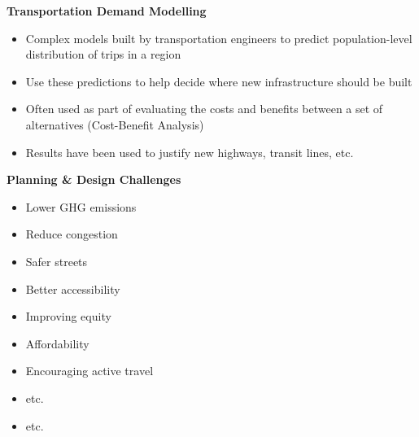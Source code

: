 \documentclass[aspectratio=169]{beamer}
\begin{document}
\begin{frame}
	
	\textbf{Transportation Demand Modelling}
	\vspace{4mm}
	
	\begin{itemize}
		
		\item Complex models built by transportation engineers to predict population-level distribution of trips in a region
		
		\item Use these predictions to help decide where new infrastructure should be built
		
		\item Often used as part of evaluating the costs and benefits between a set of alternatives (Cost-Benefit Analysis)
		
		\item Results have been used to justify new highways, transit lines, etc.
		
	\end{itemize}	
	
\end{frame}


\begin{frame}
	\textbf{Planning \& Design Challenges}
	\vspace{4mm}
	
	\begin{itemize}
		\item Lower GHG emissions
		\item Reduce congestion
		\item Safer streets
		\item Better accessibility
		\item Improving equity
		\item Affordability
		\item Encouraging active travel	
		\item etc.
		\item etc.
	\end{itemize}
	
\end{frame}
\end{document}
